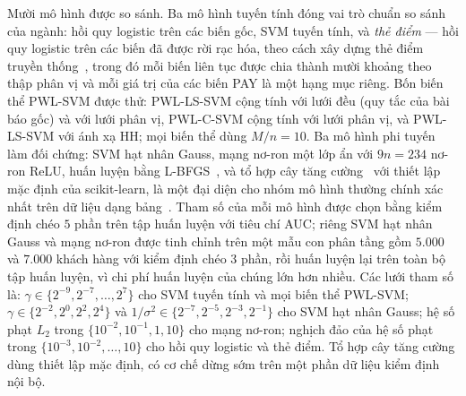 Mười mô hình được so sánh. Ba mô hình tuyến tính đóng vai trò chuẩn so sánh của ngành: hồi quy logistic trên các biến gốc, SVM tuyến tính, và \emph{thẻ điểm} --- hồi quy logistic trên các biến đã được rời rạc hóa, theo cách xây dựng thẻ điểm truyền thống~\cite{thomas2002}, trong đó mỗi biến liên tục được chia thành mười khoảng theo thập phân vị và mỗi giá trị của các biến PAY là một hạng mục riêng. Bốn biến thể PWL-SVM được thử: PWL-LS-SVM cộng tính với lưới đều (quy tắc của bài báo gốc) và với lưới phân vị, PWL-C-SVM cộng tính với lưới phân vị, và PWL-LS-SVM với ánh xạ HH; mọi biến thể dùng $M/n=10$. Ba mô hình phi tuyến làm đối chứng: SVM hạt nhân Gauss, mạng nơ-ron một lớp ẩn với $9n=234$ nơ-ron ReLU, huấn luyện bằng L-BFGS~\cite{liu1989}, và tổ hợp cây tăng cường~\cite{friedman2001} với thiết lập mặc định của scikit-learn, là một đại diện cho nhóm mô hình thường chính xác nhất trên dữ liệu dạng bảng~\cite{lessmann2015}. Tham số của mỗi mô hình được chọn bằng kiểm định chéo $5$ phần trên tập huấn luyện với tiêu chí AUC; riêng SVM hạt nhân Gauss và mạng nơ-ron được tinh chỉnh trên một mẫu con phân tầng gồm $5.000$ và $7.000$ khách hàng với kiểm định chéo $3$ phần, rồi huấn luyện lại trên toàn bộ tập huấn luyện, vì chi phí huấn luyện của chúng lớn hơn nhiều. Các lưới tham số là: $\gamma\in\{2^{-9},2^{-7},\dots,2^{7}\}$ cho SVM tuyến tính và mọi biến thể PWL-SVM; $\gamma\in\{2^{-2},2^{0},2^{2},2^{4}\}$ và $1/\sigma^2\in\{2^{-7},2^{-5},2^{-3},2^{-1}\}$ cho SVM hạt nhân Gauss; hệ số phạt $L_2$ trong $\{10^{-2},10^{-1},1,10\}$ cho mạng nơ-ron; nghịch đảo của hệ số phạt trong $\{10^{-3},10^{-2},\dots,10\}$ cho hồi quy logistic và thẻ điểm. Tổ hợp cây tăng cường dùng thiết lập mặc định, có cơ chế dừng sớm trên một phần dữ liệu kiểm định nội bộ.

